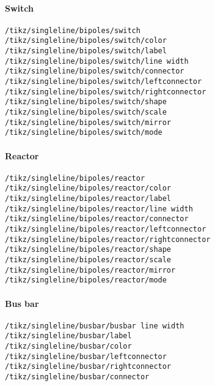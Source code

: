 \documentclass[a4]{article}
\begin{document}
\begin{footnotesize}
\paragraph{Switch}
\begin{verbatim}
/tikz/singleline/bipoles/switch
/tikz/singleline/bipoles/switch/color
/tikz/singleline/bipoles/switch/label
/tikz/singleline/bipoles/switch/line width
/tikz/singleline/bipoles/switch/connector
/tikz/singleline/bipoles/switch/leftconnector
/tikz/singleline/bipoles/switch/rightconnector
/tikz/singleline/bipoles/switch/shape
/tikz/singleline/bipoles/switch/scale
/tikz/singleline/bipoles/switch/mirror
/tikz/singleline/bipoles/switch/mode
\end{verbatim}
\paragraph{Reactor}
\begin{verbatim}
/tikz/singleline/bipoles/reactor
/tikz/singleline/bipoles/reactor/color
/tikz/singleline/bipoles/reactor/label
/tikz/singleline/bipoles/reactor/line width
/tikz/singleline/bipoles/reactor/connector
/tikz/singleline/bipoles/reactor/leftconnector
/tikz/singleline/bipoles/reactor/rightconnector
/tikz/singleline/bipoles/reactor/shape
/tikz/singleline/bipoles/reactor/scale
/tikz/singleline/bipoles/reactor/mirror
/tikz/singleline/bipoles/reactor/mode
\end{verbatim}
\paragraph{Bus bar}
\begin{verbatim}
/tikz/singleline/busbar/busbar line width
/tikz/singleline/busbar/label
/tikz/singleline/busbar/color
/tikz/singleline/busbar/leftconnector
/tikz/singleline/busbar/rightconnector
/tikz/singleline/busbar/connector
\end{verbatim}
\end{footnotesize}
\onecolumn
\end{document}
